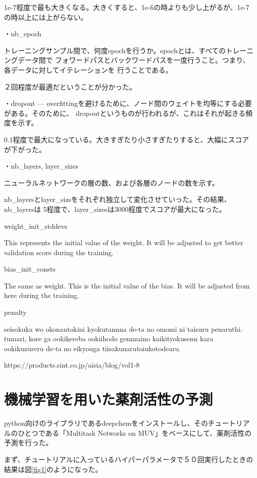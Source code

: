 \documentclass[a4j,11pt]{jarticle}
\begin{document}
1e-7程度で最も大きくなる。大きくすると、1e-6の時よりも少し上がるが、1e-7の時以上には上がらない。

・nb\_epoch

トレーニングサンプル間で、何度epochを行うか。epochとは、すべてのトレーニングデータ間で
フォワードパスとバックワードパスを一度行うこと。つまり、各データに対してイテレーションを
行うことである。

２回程度が最適だということが分かった。


・dropout
---
overfittingを避けるために、ノード間のウェイトを均等にする必要がある。そのために、
dropoutというものが行われるが、これはそれが起きる頻度を示す。

0.1程度で最大になっている。大きすぎたり小さすぎたりすると、大幅にスコアが下がった。


・nb\_layers, layer\_sizes

ニューラルネットワークの層の数、および各層のノードの数を示す。

nb\_layersとlayer\_sizsをそれぞれ独立して変化させていった。その結果、nb\_layersは
5程度で、layer\_sizesは3000程度でスコアが最大になった。

weight_init_stddevs

This represents the initial value of the weight. It will be adjusted to get better validation score
during the training.


bias_init_consts

The same as weight. This is the initial value of the bias. It will be adjusted from here during the training.

penalty

seisokuka wo okonautokini kyokutannna de-ta no omomi ni taisuru penaruthi. tumari, kore ga ookikereba ookiihodo
gennzaino kaikityokusenn kara ookikuzureru de-ta no eikyouga tiisakunarutoiukotodearu.

https://products.sint.co.jp/aisia/blog/vol1-8

\newpage

\section{機械学習を用いた薬剤活性の予測}

python向けのライブラリであるdeepchemをインストールし、そのチュートリアルのひとつである「Multitask Networks on MUV」をベースにして、薬剤活性の予測を行った。

まず、チュートリアルに入っているハイパーパラメータで５０回実行したときの結果は図\ref{fig1}のようになった。
\end{document}
